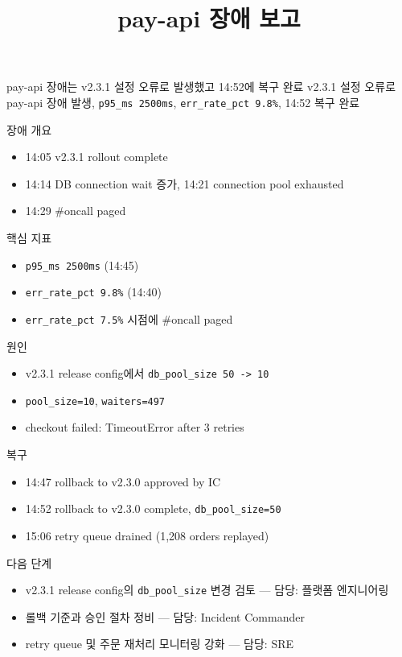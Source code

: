 \documentclass[aspectratio=169]{beamer}
\title{pay-api 장애 보고}
\author{}
\date{}
\begin{document}
\begin{frame}{pay-api 장애는 v2.3.1 설정 오류로 발생했고 14:52에 복구 완료}
\centering
v2.3.1 설정 오류로 pay-api 장애 발생, \texttt{p95\_ms 2500ms}, \texttt{err\_rate\_pct 9.8\%}, 14:52 복구 완료
\end{frame}

\begin{frame}{장애 개요}
\begin{itemize}
  \item 14:05 v2.3.1 rollout complete
  \item 14:14 DB connection wait 증가, 14:21 connection pool exhausted
  \item 14:29 \#oncall paged
\end{itemize}
\end{frame}

\begin{frame}{핵심 지표}
\begin{itemize}
  \item \texttt{p95\_ms 2500ms} (14:45)
  \item \texttt{err\_rate\_pct 9.8\%} (14:40)
  \item \texttt{err\_rate\_pct 7.5\%} 시점에 \#oncall paged
\end{itemize}
\end{frame}

\begin{frame}{원인}
\begin{itemize}
  \item v2.3.1 release config에서 \texttt{db\_pool\_size 50 -> 10}
  \item \texttt{pool\_size=10}, \texttt{waiters=497}
  \item checkout failed: TimeoutError after 3 retries
\end{itemize}
\end{frame}

\begin{frame}{복구}
\begin{itemize}
  \item 14:47 rollback to v2.3.0 approved by IC
  \item 14:52 rollback to v2.3.0 complete, \texttt{db\_pool\_size=50}
  \item 15:06 retry queue drained (1,208 orders replayed)
\end{itemize}
\end{frame}

\begin{frame}{다음 단계}
\begin{itemize}
  \item v2.3.1 release config의 \texttt{db\_pool\_size} 변경 검토 --- 담당: 플랫폼 엔지니어링
  \item 롤백 기준과 승인 절차 정비 --- 담당: Incident Commander
  \item retry queue 및 주문 재처리 모니터링 강화 --- 담당: SRE
\end{itemize}
\end{frame}
\end{document}
